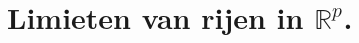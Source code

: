 \documentclass[main.tex]{subfiles}
\begin{document}
\chapter{Limieten van rijen in $\mathbb{R}^{p}$.}
\label{cha:cont-voor-funct}
\end{document}
